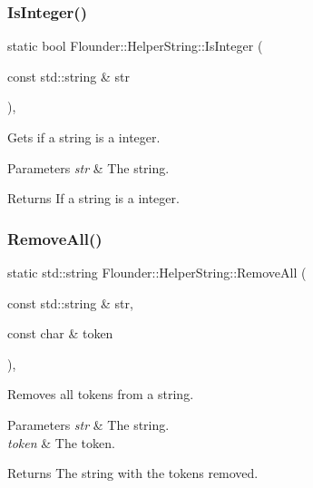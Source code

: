 \subsubsection{\texorpdfstring{Is\+Integer()}{IsInteger()}}
{\footnotesize\ttfamily static bool Flounder\+::\+Helper\+String\+::\+Is\+Integer (\begin{DoxyParamCaption}\item[{const std\+::string \&}]{str }\end{DoxyParamCaption})\hspace{0.3cm}{\ttfamily [inline]}, {\ttfamily [static]}}



Gets if a string is a integer. 


\begin{DoxyParams}{Parameters}
{\em str} & The string. \\
\hline
\end{DoxyParams}
\begin{DoxyReturn}{Returns}
If a string is a integer. 
\end{DoxyReturn}
\mbox{\label{class_flounder_1_1_helper_string_a961f2fe767f03aac01d5792ee20302e4}} 
\subsubsection{\texorpdfstring{Remove\+All()}{RemoveAll()}}
{\footnotesize\ttfamily static std\+::string Flounder\+::\+Helper\+String\+::\+Remove\+All (\begin{DoxyParamCaption}\item[{const std\+::string \&}]{str,  }\item[{const char \&}]{token }\end{DoxyParamCaption})\hspace{0.3cm}{\ttfamily [inline]}, {\ttfamily [static]}}



Removes all tokens from a string. 


\begin{DoxyParams}{Parameters}
{\em str} & The string. \\
\hline
{\em token} & The token. \\
\hline
\end{DoxyParams}
\begin{DoxyReturn}{Returns}
The string with the tokens removed. 
\end{DoxyReturn}
\mbox{\label{class_flounder_1_1_helper_string_a05131aa25732ee98338ab6715fa0cd77}} 
